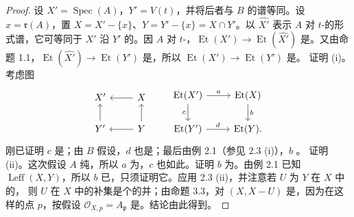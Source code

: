 \begin{proof}
设 $X'=\operatorname{Spec}(A)$，$Y'=V(t)$，并将后者与 $B$ 的谱等同。设 $x=\mathfrak r(A)$，置 $X=X'-\{x\}$、$Y=Y'-\{x\}=X\cap Y'$。以 $\widehat{X'}$ 表示 $A$ 对 $t$-的形式谱，它可等同于 $X'$ 沿 $Y'$ 的。因 $A$ 对 $t$-，$\operatorname{Et}(X')\to\operatorname{Et}(\widehat{X'})$ 是。又由命题 1.1，$\operatorname{Et}(\widehat{X'})\to\operatorname{Et}(Y')$ 是，所以 $\operatorname{Et}(X')\to\operatorname{Et}(Y')$ 是。
证明 (i)。考虑图
\[\begin{tikzcd}X'&X\arrow[l]\\Y'\arrow[u]&Y\arrow[l]\arrow[u]\end{tikzcd}\qquad
\begin{tikzcd}\operatorname{Et}(X')\arrow[r,"a"]\arrow[d,"c"']&\operatorname{Et}(X)\arrow[d,"b"]\\\operatorname{Et}(Y')\arrow[r,"d"]&\operatorname{Et}(Y).\end{tikzcd}\]
刚已证明 $c$ 是；由 $B$ 假设，$d$ 也是；最后由例 2.1（参见 2.3 (i)），$b$ 。
证明 (ii)。这次假设 $A$ 纯，所以 $a$ 为，$c$ 也如此。证明 $b$ 为。由例 2.1 已知 $\operatorname{Leff}(X,Y)$，所以 $b$ 已，只须证明它。应用 2.3 (ii)，并注意若 $U$ 为 $Y$ 在 $X$ 中的，
则 $U$ 在 $X$ 中的补集是个的并；由命题 3.3，对 $(X,X-U)$ 是，因为在这样的点 $p$，按假设 $\mathcal O_{X,p}=A_{\mathfrak p}$ 是。结论由此得到。
\end{proof}
